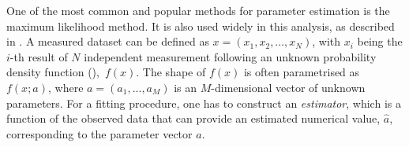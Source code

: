 One of the most common and popular methods for parameter estimation is the maximum likelihood method. 
It is also used widely in this analysis, as described in .
A measured dataset can be defined as $x = (x_1, x_2,...,x_N)$, with $x_i$ being the $i$-th result of $N$ independent measurement following an unknown probability density function (\PDF),~$f(x)$.
The shape of $f(x)$ is often parametrised as $f(x; a)$, where $a=(a_1,...,a_M)$ is an $M$-dimensional vector of unknown parameters. 
For a fitting procedure, one has to construct an \textit{estimator}, which is a function of the observed data that can provide an estimated numerical value, $\hat{a}$, corresponding to the parameter vector $a$.


